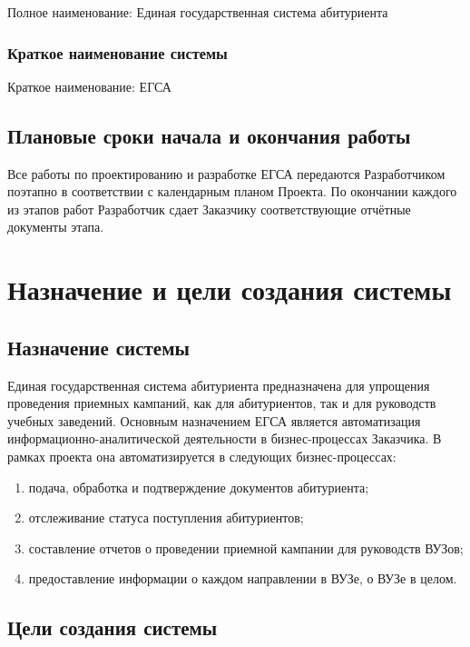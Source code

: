 \documentclass[a4paper, 14pt]{extarticle}
\begin{document}
Полное наименование: Единая государственная система абитуриента

\subsubsection{Краткое наименование системы}

Краткое наименование: ЕГСА

\subsection{Плановые сроки начала и окончания работы}

Все работы по проектированию и разработке ЕГСА передаются Разработчиком поэтапно
в соответствии с календарным планом Проекта. По окончании каждого из этапов
работ Разработчик сдает Заказчику соответствующие отчётные документы этапа.

\section{Назначение и цели создания системы}

\subsection{Назначение системы}

Единая государственная система абитуриента предназначена для упрощения
проведения приемных кампаний, как для абитуриентов, так и для руководств учебных
заведений. Основным назначением ЕГСА является автоматизация
информационно-аналитической деятельности в бизнес-процессах Заказчика. В рамках
проекта она автоматизируется в следующих бизнес-процессах:
\begin{enumerate}
  \item подача, обработка и подтверждение документов абитуриента;
  \item отслеживание статуса поступления абитуриентов;
  \item составление отчетов о проведении приемной кампании для руководств ВУЗов;
  \item предоставление информации о каждом направлении в ВУЗе, о ВУЗе в целом.
\end{enumerate}

\subsection{Цели создания системы}
\end{document}
